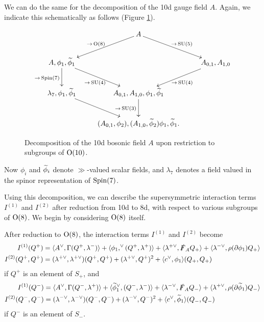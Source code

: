 \documentclass[10pt, oneside]{article}
\begin{document}
We can do the same for the decomposition of the 10d gauge field $A$.  Again, we indicate this schematically as follows (Figure \ref{fig:8dbosondecomp}).
\begin{figure}[!h]
\[\xymatrix{
&A \ar[dl]_{\to\,  \mr{O}(8)} \ar[dr]^{\to\,  \SU(5)} & \\
A,\phi_1, \wt \phi_1 \ar[dr]_{\to\,  \SU(4)} \ar[d]_{\to\,  \Spin(7)} &&A_{0,1}, A_{1,0} \ar[dl]^{\to\,  \SU(4)} \\
\lambda_7, \phi_1, \wt \phi_1 \ar[dr] &A_{0,1},A_{1,0},\phi_1, \wt \phi_1 \ar[d]_{\to\,  \SU(3)} & \\
&(A_{0,1}, \phi_2) ,(A_{1,0}, \wt \phi_2) \phi_1, \wt \phi_1.&
}
\]
\caption{Decomposition of the 10d bosonic field $A$ upon restriction to subgroups of $\mathrm{O}(10)$.}
\label{fig:8dbosondecomp}
\end{figure}
Now $\phi_i$ and $\widetilde{\phi}_i$ denote $\gg$-valued scalar fields, and $\lambda_7$ denotes a field valued in the spinor representation of $\mathrm{Spin}(7)$.

Using this decomposition, we can describe the supersymmetric interaction terms $I^{(1)}$ and $I^{(2)}$ after reduction from 10d to 8d, with respect to various subgroups of $\mathrm{O}(8)$.  We begin by considering $\mathrm{O}(8)$ itself.
\begin{prop} \label{O8_decomposition_of_susy_prop}

After reduction to $\mathrm{O}(8)$, the interaction terms $I^{(1)}$ and $I^{(2)}$ become
\begin{align*}
I^{(1)}(Q^+) &= \langle A^\vee, \Gamma(Q^+, \lambda^-)\rangle + \langle \phi_1,^\vee (Q^+,\lambda^+)\rangle + \langle \lambda^{+\vee}, \slashed{F}_A Q_+ \rangle + \langle \lambda^{-\vee}, \rho(\partial \phi_1)Q_+ \rangle\\
I^{(2)}(Q^+, Q^+) &= (\lambda^{+\vee}, \lambda^{+\vee})(Q^+,Q^+) + (\lambda^{+\vee},Q^+)^2 + \langle c^\vee, \phi_1\rangle(Q_+,Q_+)
\end{align*}
if $Q^+$ is an element of $S_+$, and
\begin{align*}
I^{(1)}(Q^-) &= \langle A^\vee, \Gamma(Q^-, \lambda^+)\rangle + \langle \widetilde{\phi}_1^\vee, (Q^-,\lambda^-)\rangle+ \langle \lambda^{-\vee}, \slashed{F}_A Q_- \rangle + \langle \lambda^{+\vee}, \rho(\partial \widetilde{\phi}_1)Q_- \rangle\\
I^{(2)}(Q^-, Q^-) &= (\lambda^{-\vee}, \lambda^{-\vee})(Q^-,Q^-) + (\lambda^{-\vee},Q^-)^2 + \langle c^\vee, \widetilde{\phi}_1\rangle(Q_-,Q_-)
\end{align*}
if $Q^-$ is an element of $S_-$.
\end{prop}
\end{document}
